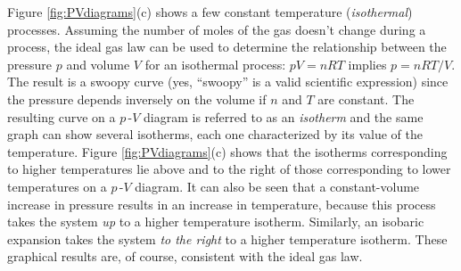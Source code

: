 Figure \ref{fig:PVdiagrams}(c) shows a few constant temperature (\emph{isothermal}) processes. Assuming the number of moles of the gas
doesn't change during a process, the ideal gas law can be used to
determine the relationship between the pressure $p$ and volume $V$ for
an isothermal process: $pV = nRT$ implies $p = nRT/V$.  The result is
a swoopy curve (yes, ``swoopy'' is a valid scientific expression)
since the pressure depends inversely on the volume if $n$ and $T$ are
constant. The resulting curve on a $p$\,-$V$ diagram is referred to as
an \textit{isotherm} and the same graph can show several 
isotherms, each one characterized by its value of the temperature.
Figure \ref{fig:PVdiagrams}(c) shows that the isotherms corresponding to
higher temperatures lie above and to the right of those corresponding 
to lower temperatures on a $p$\,-$V$ diagram.  It can also be seen 
that a constant-volume increase in pressure results in an increase in 
temperature, because this process takes the system \textit{up} to a 
higher temperature
isotherm. Similarly, an isobaric expansion takes the system \textit{to the 
right} to a higher temperature isotherm.  These graphical results
are, of course, consistent with the ideal gas law.

